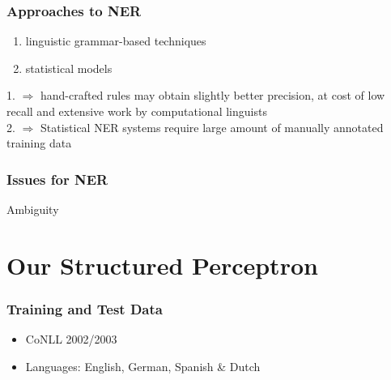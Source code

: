 \documentclass[10pt]{beamer}
\begin{document}

\begin{frame}
\frametitle{Approaches to NER}

\begin{enumerate}
 \item linguistic grammar-based techniques
 \item statistical models
\end{enumerate}

1. $\Rightarrow$  hand-crafted rules may obtain slightly better precision, at cost of low recall
and extensive work by computational linguists\\

2. $\Rightarrow$ Statistical NER systems require large amount of manually annotated training data

\end{frame}




\begin{frame}
\frametitle{}
\end{frame}


\begin{frame}
\frametitle{Issues for NER}

Ambiguity


\end{frame}



\section{Our Structured Perceptron}
\begin{frame}
\frametitle{Training and Test Data}

\begin{itemize}
 \item CoNLL 2002/2003 
 \item Languages: English, German, Spanish \& Dutch
\end{itemize}


\end{frame}
\end{document}
